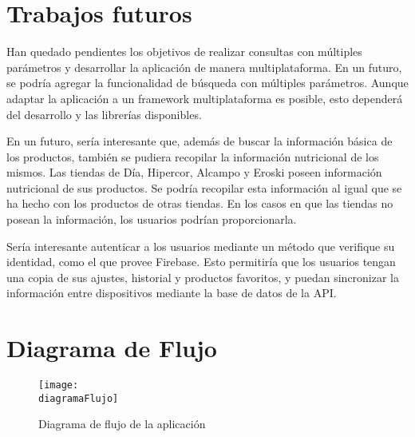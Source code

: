 \documentclass[12pt,twoside,titlepage]{report}
\newcommand{\diagramaFlujo}{images/Supercomparator_diagrama.drawio.png}
\newcommand\blankpage{%
    \newpage
    \null
    \thispagestyle{empty}%
    \newpage}
\begin{document}
\section{Trabajos futuros}

Han quedado pendientes los objetivos de realizar consultas con múltiples parámetros y desarrollar la aplicación de manera multiplataforma. En un futuro, se podría agregar la funcionalidad de búsqueda con múltiples parámetros. Aunque adaptar la aplicación a un framework multiplataforma es posible, esto dependerá del desarrollo y las librerías disponibles.

En un futuro, sería interesante que, además de buscar la información básica de los productos, también se pudiera recopilar la información nutricional de los mismos. Las tiendas de Día, Hipercor, Alcampo y Eroski poseen información nutricional de sus productos. Se podría recopilar esta información al igual que se ha hecho con los productos de otras tiendas. En los casos en que las tiendas no posean la información, los usuarios podrían proporcionarla.

Sería interesante autenticar a los usuarios mediante un método que verifique su identidad, como el que provee Firebase. Esto permitiría que los usuarios tengan una copia de sus ajustes, historial y productos favoritos, y puedan sincronizar la información entre dispositivos mediante la base de datos de la API.


\blankpage

\section{Diagrama de Flujo}

\begin{figure}[H]
    \centering
    \texttt{[image: \\diagramaFlujo]}
    \caption{Diagrama de flujo de la aplicación}
    \label{fig:diagramaFlujo}
\end{figure}

\blankpage

{}
\end{document}
